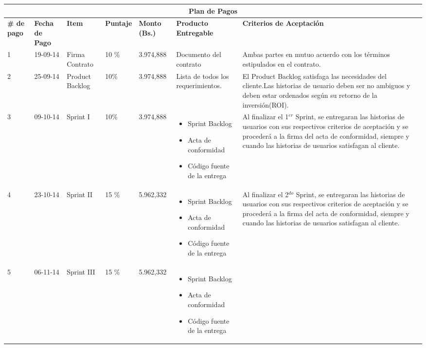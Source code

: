 \documentclass[11pt,letterpaper]{report}
\begin{document}
{ 
\scriptsize
\begin{longtable}{|p{0.8cm}|p{1.5cm}|p{1.5cm}|p{1.20cm}|p{1.5cm}|p{3cm}|p{4cm}|}
	\hline
	 \multicolumn{7}{|c|}{\textbf{Plan de Pagos}} \\ \hline
	 \textbf{ \# de pago} & \textbf{Fecha de Pago} &\textbf{ Item} & \textbf{Puntaje} & \textbf{Monto (Bs.)} & \textbf{Producto Entregable} & \textbf{Criterios de Aceptación} \\ 
	 \hline
	 \endhead
	 1 & 19-09-14 & Firma Contrato & 10 \% & 3.974,888 & Documento del contrato & Ambas partes en mutuo acuerdo con los términos estipulados en el contrato. \\ \hline
	 2 & 25-09-14 & Product Backlog & 10\% & 3.974,888 & Lista de todos los requerimientos. & El Product Backlog satisfaga las necesidades del cliente.Las historias de usuario deben ser no ambiguos y deben estar ordenados según su retorno de la inversión(ROI).\\ \hline
	 3 & 09-10-14 & Sprint I & 10\% & 3.974,888 & 
		\begin{itemize}
			\item Sprint Backlog
			\item Acta de conformidad
			\item Código fuente de la entrega 
		\end{itemize}
 & Al finalizar el 1$^{er}$ Sprint, se entregaran las historias de usuarios con sus respectivos criterios de aceptación y se procederá a la firma del acta de conformidad, siempre y cuando las historias de usuarios satisfagan al cliente.\\ \hline
	 4 & 23-10-14 & Sprint II & 15 \% & 5.962,332 &
	 \begin{itemize}
	 			\item Sprint Backlog
	 			\item Acta de conformidad
	 			\item Código fuente de la entrega 
	 		\end{itemize}
	 & Al finalizar el 2$^{do}$ Sprint, se entregaran las historias de usuarios con sus respectivos criterios de aceptación y se procederá a la firma del acta de conformidad, siempre y cuando las historias de usuarios satisfagan al cliente.\\ \hline
	 5 & 06-11-14 & Sprint III & 15 \% & 5.962,332 &
	  \begin{itemize}
	  	 			\item Sprint Backlog
	  	 			\item Acta de conformidad
	  	 			\item Código fuente de la entrega 

\end{itemize}
\end{longtable}}
\end{document}
